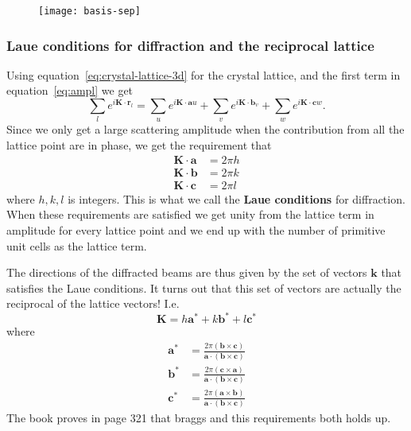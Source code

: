 \documentclass[11pt]{article}
\begin{document}
\begin{figure}[!ht]
	\centering
	\texttt{[image: basis-sep]}
	\caption{}
	\label{fig:basis-sep}
\end{figure}

\newpage
\subsubsection{Laue conditions for diffraction and the reciprocal lattice}
Using equation~\ref{eq:crystal-lattice-3d} for the crystal lattice, and the first term in equation~\ref{eq:ampl} we get
\begin{equation}
	\sum_l e^{i\mathbf{K} \cdot \mathbf{r}_l} =\sum_u e^{i\mathbf{K} \cdot \mathbf{a}u} + \sum_v e^{i\mathbf{K} \cdot \mathbf{b}_v} + \sum_w e^{i\mathbf{K} \cdot \mathbf{c}w}.
\end{equation}
Since we only get a large scattering amplitude when the contribution from all the lattice point are in phase, we get the requirement that
\begin{align}
	\mathbf{K} \cdot \mathbf{a} &= 2\pi h \\
	\mathbf{K} \cdot \mathbf{b} &= 2\pi k \\
	\mathbf{K} \cdot \mathbf{c} &= 2\pi l 
\end{align}
where $h,k,l$ is integers. This is what we call the \textbf{Laue conditions} for diffraction. When these requirements are satisfied we get unity from the lattice term in amplitude for every lattice point and we end up with the number of primitive unit cells as the lattice term.

The directions of the diffracted beams are thus given by the set of vectors $\mathbf{k}$ that satisfies the Laue conditions. It turns out that this set of vectors are actually the reciprocal of the lattice vectors! I.e.
\begin{equation}
	\mathbf{K} = h\mathbf{a^*} + k\mathbf{b^*} + l \mathbf{c^*}
\end{equation}
where 
\begin{align}
	\mathbf{a^*} &= \frac{2\pi(\mathbf{b}\times\mathbf{c})}{\mathbf{a}\cdot(\mathbf{b}\times\mathbf{c})} \nonumber\\
	\mathbf{b^*} &= \frac{2\pi(\mathbf{c}\times\mathbf{a})}{\mathbf{a}\cdot(\mathbf{b}\times\mathbf{c})} \nonumber\\
	\mathbf{c^*} &= \frac{2\pi(\mathbf{a}\times\mathbf{b})}{\mathbf{a}\cdot(\mathbf{b}\times\mathbf{c})} 
	\label{eq:reciprocal-lattice}
\end{align}
The book proves in page 321 that braggs and this requirements both holds up.
\end{document}
